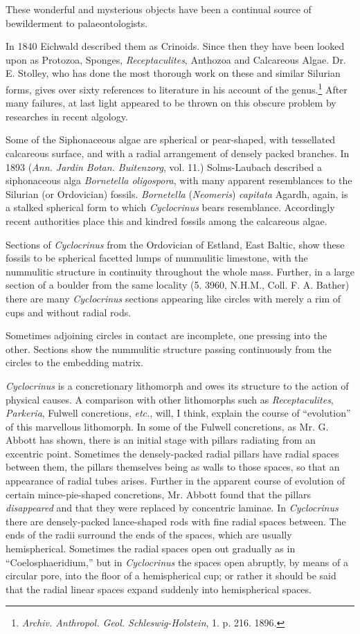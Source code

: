 \documentclass[a4paper, 12pt, oneside]{article}
\begin{document}
These wonderful and mysterious objects have been a continual source of bewilderment to palaeontologists.

In 1840 Eichwald described them as Crinoids. Since then they have been looked upon as Protozoa, Sponges, \emph{Receptaculites}, Anthozoa and Calcareous Algae. Dr. E. Stolley, who has done the most thorough work on these and similar Silurian forms, gives over sixty references to literature in his account of the genus.\footnote{\emph{Archiv. Anthropol. Geol. Schleswig-Holstein}, 1. p. 216. 1896.} After many failures, at last light appeared to be thrown on this obscure problem by researches in recent algology.

Some of the Siphonaceous algae are spherical or pear-shaped, with tessellated calcareous surface, and with a radial arrangement of densely packed branches. In 1893 (\emph{Ann. Jardin Botan. Buitenzorg}, vol. 11.) Solms-Laubach described a siphonaceous alga \emph{Bornetella oligospora}, with many apparent resemblances to the Silurian (or Ordovician) fossils. \emph{Bornetella} (\emph{Neomeris}) \emph{capitata} Agardh, again, is a stalked spherical form to which \emph{Cyclocrinus} bears resemblance. Accordingly recent authorities place this and kindred fossils among the calcareous algae.

Sections of \emph{Cyclocrinus} from the Ordovician of Estland, East Baltic, show these fossils to be spherical facetted lumps of nummulitic limestone, with the nummulitic structure in continuity throughout the whole mass. Further, in a large section of a boulder from the same locality (5. 3960, N.H.M., Coll. F. A. Bather) there are many \emph{Cyclocrinus} sections appearing like circles with merely a rim of cups and without radial rods.

Sometimes adjoining circles in contact are incomplete, one pressing into the other. Sections show the nummulitic structure passing continuously from the circles to the embedding matrix.

\emph{Cyclocrinus} is a concretionary lithomorph and owes its structure to the action of physical causes. A comparison with other lithomorphs such as \emph{Receptaculites}, \emph{Parkeria}, Fulwell concretions, \emph{etc.}, will, I think, explain the course of ``evolution'' of this marvellous lithomorph. In some of the Fulwell concretions, as Mr. G. Abbott has shown, there is an initial stage with pillars radiating from an excentric point. Sometimes the densely-packed radial pillars have radial spaces between them, the pillars themselves being as walls to those spaces, so that an appearance of radial tubes arises. Further in the apparent course of evolution of certain mince-pie-shaped concretions, Mr. Abbott found that the pillars \emph{disappeared} and that they were replaced by concentric laminae. In \emph{Cyclocrinus} there are densely-packed lance-shaped rods with fine radial spaces between. The ends of the radii surround the ends of the spaces, which are usually hemispherical. Sometimes the radial spaces open out gradually as in ``Coelosphaeridium,'' but in \emph{Cyclocrinus} the spaces open abruptly, by means of a circular pore, into the floor of a hemispherical cup; or rather it should be said that the radial linear spaces expand suddenly into hemispherical spaces.
\end{document}
